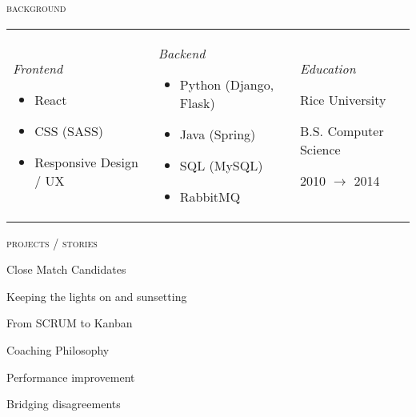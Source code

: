 \documentclass[11pt]{amsart}
\begin{document}
\bigskip
\textsc{background}

\begin{tabularx}{\textwidth}{@{}X X X@{}}
\textit{Frontend}
\bigskip
\begin{itemize}[noitemsep, leftmargin=2em, label=\raisebox{0.25ex}{\tiny$\bullet$}]
\item React
\item CSS (SASS)
\item Responsive Design / UX
\end{itemize}
& 
\textit{Backend} 
\bigskip
\begin{itemize}[noitemsep, leftmargin=2em, label=\raisebox{0.25ex}{\tiny$\bullet$}]
\item Python (Django, Flask)
\item Java (Spring)
\item SQL (MySQL)
\item RabbitMQ
\end{itemize}

 &
 \textit{Education} 
 \bigskip
 
Rice University

B.S. Computer Science

 2010 $\rightarrow$  2014

\end{tabularx}
\newpage
\textsc{projects / stories}

Close Match Candidates

Keeping the lights on and sunsetting

From SCRUM to Kanban

Coaching Philosophy

Performance improvement

Bridging disagreements

\endgroup
\end{document}
